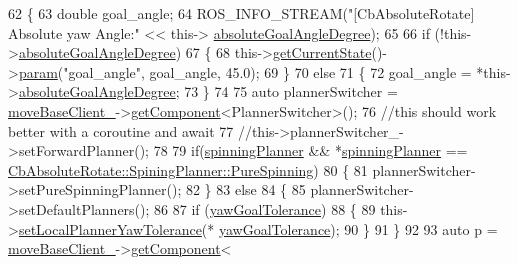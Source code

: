 \begin{DoxyCode}
62 \{
63     \textcolor{keywordtype}{double} goal\_angle;
64     ROS\_INFO\_STREAM(\textcolor{stringliteral}{"[CbAbsoluteRotate] Absolute yaw Angle:"} << this->
      \hyperlink{classcl__move__base__z_1_1CbAbsoluteRotate_ad5d0e21549940444e1cb525cda73329a}{absoluteGoalAngleDegree});
65 
66     \textcolor{keywordflow}{if} (!this->\hyperlink{classcl__move__base__z_1_1CbAbsoluteRotate_ad5d0e21549940444e1cb525cda73329a}{absoluteGoalAngleDegree})
67     \{
68         this->\hyperlink{classsmacc_1_1ISmaccClientBehavior_a34fde34e48fa13db622ee60d8374d0b8}{getCurrentState}()->\hyperlink{classsmacc_1_1ISmaccState_a4f2ff8e3eda8aa9bbb60c8ff17d0def1}{param}(\textcolor{stringliteral}{"goal\_angle"}, goal\_angle, 45.0);
69     \}
70     \textcolor{keywordflow}{else}
71     \{
72         goal\_angle = *this->\hyperlink{classcl__move__base__z_1_1CbAbsoluteRotate_ad5d0e21549940444e1cb525cda73329a}{absoluteGoalAngleDegree};
73     \}
74 
75     \textcolor{keyword}{auto} plannerSwitcher = \hyperlink{classcl__move__base__z_1_1CbMoveBaseClientBehaviorBase_ab2ef219464cfac8659b4a87c8d0db6d5}{moveBaseClient\_}->\hyperlink{classsmacc_1_1ISmaccClient_adef78db601749ca63c19e74a27cb88cc}{getComponent}<PlannerSwitcher>();
76     \textcolor{comment}{//this should work better with a coroutine and await}
77     \textcolor{comment}{//this->plannerSwitcher\_->setForwardPlanner();}
78     
79     \textcolor{keywordflow}{if}(\hyperlink{classcl__move__base__z_1_1CbAbsoluteRotate_a17d836524599af072cf2e3488e491a91}{spinningPlanner} && *\hyperlink{classcl__move__base__z_1_1CbAbsoluteRotate_a17d836524599af072cf2e3488e491a91}{spinningPlanner} == 
      \hyperlink{classcl__move__base__z_1_1CbAbsoluteRotate_ab8d45e43594a3fc6a71c08f07b5dbef0aada5274435681a4ce04175bebfa6652f}{CbAbsoluteRotate::SpiningPlanner::PureSpinning})
80     \{
81         plannerSwitcher->setPureSpinningPlanner();
82     \}
83     \textcolor{keywordflow}{else}
84     \{
85         plannerSwitcher->setDefaultPlanners();
86 
87         \textcolor{keywordflow}{if} (\hyperlink{classcl__move__base__z_1_1CbAbsoluteRotate_a8d8b5b9c2c821efe101bb07c96c4bdd3}{yawGoalTolerance})
88         \{
89             this->\hyperlink{classcl__move__base__z_1_1CbAbsoluteRotate_aba8d93d615ccd43acd0684f8e88e2209}{setLocalPlannerYawTolerance}(*
      \hyperlink{classcl__move__base__z_1_1CbAbsoluteRotate_a8d8b5b9c2c821efe101bb07c96c4bdd3}{yawGoalTolerance});
90         \}
91     \}
92 
93     \textcolor{keyword}{auto} p = \hyperlink{classcl__move__base__z_1_1CbMoveBaseClientBehaviorBase_ab2ef219464cfac8659b4a87c8d0db6d5}{moveBaseClient\_}->\hyperlink{classsmacc_1_1ISmaccClient_adef78db601749ca63c19e74a27cb88cc}{getComponent}<

\end{DoxyCode}
